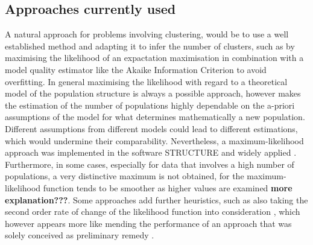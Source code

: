 \documentclass[a4paper, 11pt]{article}
\begin{document}
\subsection{Approaches currently used}
A natural approach for problems involving clustering, would be to use a well established method and adapting it to infer the number of clusters, such as by maximising the likelihood of an expactation maximisation in combination with a model quality estimator like the Akaike Information Criterion to avoid overfitting. In general maximising the likelihood with regard to a theoretical model of the population structure is always a possible approach, however makes the estimation of the number of populations highly dependable on the a-priori assumptions of the model for what determines mathematically a new population. \cite{falush2003inference} Different assumptions from different models could lead to different estimations, which would undermine their comparability. Nevertheless, a maximum-likelihood approach was implemented in the software STRUCTURE \cite{pritchard2000inference} \cite{falush2003inference} and widely applied \cite{rosenberg2002genetic} \cite{harter2004origin} \cite{rosenberg2001empirical}. Furthermore, in some cases, especially for data that involves a high number of populations, a very distinctive maximum is not obtained, for the maximum-likelihood function tends to be smoother as higher values are examined \textbf{more explanation???}. Some approaches add further heuristics, such as also taking the second order rate of change of the likelihood function into consideration \cite{evanno2005detecting}, which however appears more like mending the performance of an approach that was solely conceived as preliminary remedy \cite{pritchard2000inference}.\\
\end{document}
